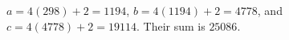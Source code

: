 $ a=4(298)+2=1194 $, $ b=4(1194)+2=4778 $, and $ c=4(4778)+2=19114 $. Their sum is $\boxed{25086}$.
